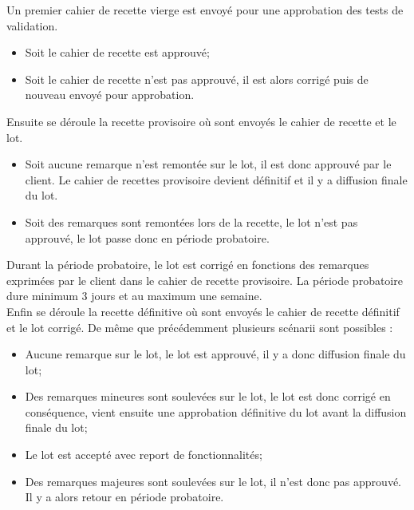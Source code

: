 Un premier cahier de recette vierge est envoyé pour une approbation des tests de validation.
\begin{itemize}
	\item Soit le cahier de recette est approuvé;
	\item Soit le cahier de recette n'est pas approuvé, il est alors corrigé puis de nouveau envoyé pour approbation.
\end{itemize}
Ensuite se déroule la recette provisoire où sont envoyés le cahier de recette et le lot.
\begin{itemize}
	\item Soit aucune remarque n'est remontée sur le lot, il est donc approuvé par le client. Le cahier de recettes provisoire devient définitif et il y a diffusion finale du lot. 
	\item Soit des remarques sont remontées lors de la recette, le lot n'est pas approuvé, le lot passe donc en période probatoire.
\end{itemize}
Durant la période probatoire, le lot est corrigé en fonctions des remarques exprimées par le client dans le cahier de recette provisoire. La période probatoire dure minimum 3 jours et au maximum une semaine. \\
Enfin se déroule la recette définitive où sont envoyés le cahier de recette définitif et le lot corrigé. De même que précédemment plusieurs scénarii sont possibles :
\begin{itemize}
	\item Aucune remarque sur le lot, le lot est approuvé, il y a donc diffusion finale du lot;
	\item Des remarques mineures sont soulevées sur le lot, le lot est donc corrigé en conséquence, vient ensuite une approbation définitive du lot avant la diffusion finale du lot;
	\item Le lot est accepté avec report de fonctionnalités;
	\item Des remarques majeures sont soulevées sur le lot, il n'est donc pas approuvé. Il y a alors retour en période probatoire.
\end{itemize}

